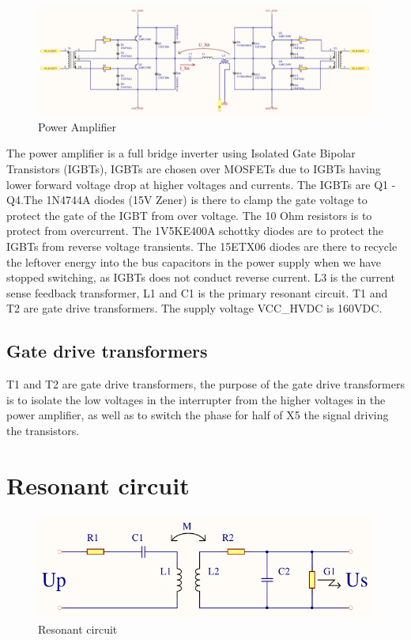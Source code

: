 \begin{figure}[h!]
    \centering
    \includegraphics[width=0.9\textheight,angle=-90]{Skjema/TK531_Utgangstrinn_r.pdf}
    \caption{Power Amplifier}
    \label{fig:tk531}
\end{figure}

The power amplifier is a full bridge inverter using Isolated Gate Bipolar Transistors (IGBTs), IGBTs are chosen over MOSFETs due to IGBTs having lower forward voltage drop at higher voltages and currents. The IGBTs are Q1 - Q4.The 1N4744A diodes (15V Zener) is there to clamp the gate voltage to protect the gate of the IGBT from over voltage. The 10 Ohm resistors is to protect from overcurrent. The 1V5KE400A schottky diodes are to protect the IGBTs from reverse voltage transients. The 15ETX06 diodes are there to recycle the leftover energy into the bus capacitors in the power supply when we have stopped switching, as IGBTs does not conduct reverse current. L3 is the current sense feedback transformer, L1 and C1 is the primary resonant circuit. T1 and T2 are gate drive transformers. The supply voltage VCC\_HVDC is 160VDC.

\subsection{Gate drive transformers}
T1 and T2 are gate drive transformers, the purpose of the gate drive transformers is to isolate the low voltages in the interrupter from the higher voltages in the power amplifier, as well as to switch the phase for half of X5 the signal driving the transistors.


\newpage
\section{Resonant circuit}
\label{sec:resonant}

\begin{figure}[h!]
    \centering
    \includegraphics[width=\textwidth]{Skjema/Spolerigg1.pdf}
    \caption{Resonant circuit}
    \label{fig:spolerigg1}
\end{figure}

